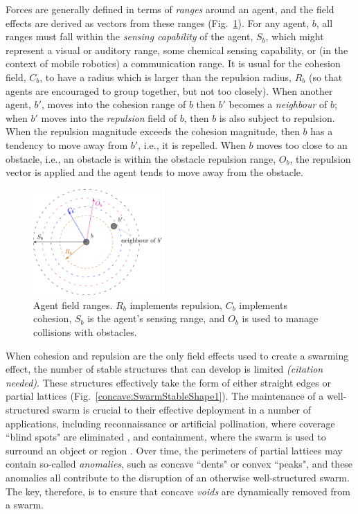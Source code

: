 \documentclass[letterpaper]{article}
\begin{document}
Forces are generally defined in terms of {\em ranges} around an agent, and the field effects are derived as vectors from these ranges (Fig.~\ref{methods:FieldEffects}). For any agent, $b$, all ranges must fall within the {\it sensing capability} of the agent, $S_b$, which might represent a visual or auditory range, some chemical sensing capability, or (in the context of mobile robotics) a communication range. 
It is usual for the cohesion field, $C_b$, to have a radius which is larger than the repulsion radius, $R_b$ (so that agents are encouraged to group together, but not too closely). When another  agent, $b'$, moves into the cohesion range of $b$  then $b'$ becomes a {\it neighbour} of $b$; when $b'$ moves into the {\it repulsion} field of $b$, then $b$ is also subject to repulsion. When the repulsion magnitude exceeds the cohesion magnitude, then $b$ has a tendency to move away from $b'$, i.e., it is repelled. When $b$ moves too close to an obstacle, i.e., an obstacle is within the obstacle repulsion range, $O_b$, the repulsion vector is applied and the agent tends to move away from the obstacle.

\begin{figure}
\begin{center}
\includegraphics[width=5cm]{figures/stableswarm}
\end{center}
\caption{Agent field ranges. $R_b$ implements repulsion, $C_b$ implements cohesion, $S_b$ is the agent's sensing range, and $O_b$ is used to manage collisions with obstacles. \label{methods:FieldEffects}}
\end{figure}

When cohesion and repulsion are the only field effects used to create a swarming effect, the number of stable structures that can develop is limited {\it (citation needed)}. These structures effectively take the form of either straight edges or partial lattices (Fig.~\ref{concave:SwarmStableShape1}). The maintenance of a well-structured swarm is crucial to their effective deployment in a number of applications, including reconnaissance or artificial pollination, where coverage ``blind spots" are eliminated \citep{elamvazhuthi2015optimal}, and containment, where the swarm is used to surround an object or region \citep{cao2012distributed}.  Over time, the perimeters of partial lattices may contain so-called {\it anomalies}, such as concave ``dents" or convex ``peaks", and these anomalies all contribute to the disruption of an otherwise well-structured swarm. The key, therefore, is to ensure that concave {\it voids} are dynamically removed from a swarm.
\end{document}
